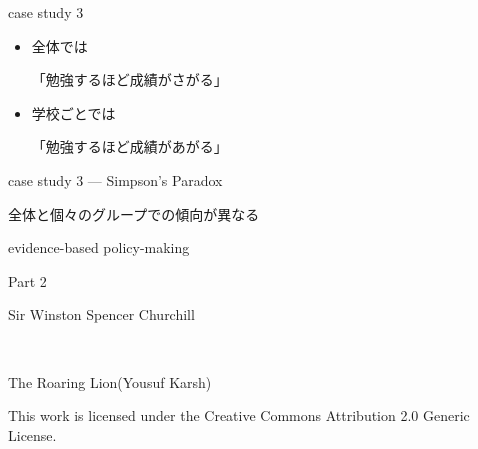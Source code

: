\documentclass[
  ignorenonframetext,
  aspectratio=169]{beamer}
\begin{document}
\begin{frame}{case study 3}
\protect\hypertarget{case-study-3-9}{}
\LARGE

\begin{itemize}
\item[\textbullet] 全体では\par
「勉強するほど成績がさがる」
\bigskip\pause
\item[\textbullet] 学校ごとでは\par
「勉強するほど成績があがる」
\end{itemize}
\end{frame}

\begin{frame}{case study 3 --- Simpson's Paradox}
\protect\hypertarget{case-study-3-simpsons-paradox}{}
\LARGE

全体と個々のグループでの傾向が異なる

\normalsize
\end{frame}

\begin{frame}{evidence-based policy-making}
\protect\hypertarget{evidence-based-policy-making-2}{}
\Huge

\raggedleft
\scalebox{2}{\textcolor{softblue}{データ}}\scalebox{1.2}{に基づき}

\scalebox{2}{\textcolor{lightpurple}{根拠}}\scalebox{1.2}{を持って}

\scalebox{1.2}{仕事を前に進めよう!}
\end{frame}

\begin{frame}{Part 2}
\protect\hypertarget{part-2}{}
\Huge

\scalebox{2}{\textcolor{lightpurple}{文書}}
\end{frame}

\begin{frame}{Sir Winston Spencer Churchill}
\protect\hypertarget{sir-winston-spencer-churchill}{}
\raggedleft\Huge


\tiny

\raggedleft

The Roaring Lion(Yousuf Karsh) \vspace{-5pt}

This work is licensed under the Creative Commons Attribution 2.0 Generic
License.
\end{frame}
\end{document}
